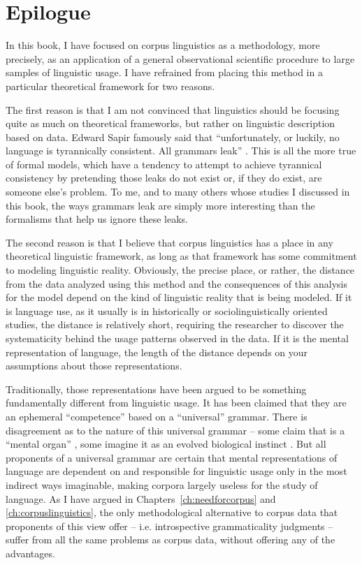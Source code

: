 \chapter{Epilogue}

In this book, I have focused on corpus linguistics as a methodology, more precisely, as an application of a general observational  scientific procedure to large  samples of linguistic usage. I have refrained from placing this method in a particular theoretical framework for two reasons.

The first reason is that I am not convinced that linguistics should be focusing quite as much on theoretical frameworks, but rather on linguistic description  based on data. Edward Sapir famously said that ``unfortunately, or luckily, no language is tyrannically consistent. All grammars leak'' \citep[39]{sapir_language:_1921}. This is all the more true of formal models, which have a tendency to attempt to achieve tyrannical consistency by pretending those leaks do not exist or, if they do exist, are someone else's problem. To me, and to many others whose studies I discussed in this book, the ways grammars leak are simply more interesting than the formalisms that help us ignore these leaks.

The second reason is that I believe that corpus linguistics has a place in any theoretical linguistic framework, as long as that framework has some commitment to modeling linguistic reality. Obviously, the precise place, or rather, the distance from the data analyzed using this method and the consequences of this analysis for the model depend on the kind of linguistic reality that is being modeled. If it is language use, as it usually is in historically or sociolinguistically  oriented studies, the distance is relatively short, requiring the researcher to discover the systematicity behind the usage patterns observed in the data. If it is the mental representation of language, the length of the distance depends on your assumptions about those representations.

Traditionally, those representations have been argued to be something fundamentally different from linguistic usage. It has been claimed that they are an ephemeral ``competence''  based on a ``universal'' grammar.  There is disagreement as to the nature of this universal grammar -- some claim that is a ``mental organ'' \citep{chomsky_rules_1980}, some imagine it as an evolved biological instinct \citep{pinker_language_1994}. But all proponents of a universal grammar are certain that mental representations of language are dependent on and responsible for linguistic usage only in the most indirect ways imaginable, making corpora largely useless for the study of language. As I have argued in Chapters~\ref{ch:needforcorpus} and \ref{ch:corpuslinguistics}, the only methodological alternative to corpus data that proponents of this view offer -- i.e. introspective  grammaticality  judgments -- suffer from all the same problems as corpus data, without offering any of the advantages.

